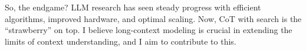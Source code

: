 So, the endgame?
%
LLM research has seen steady progress with efficient algorithms, improved hardware, and optimal scaling.
%
Now, CoT with search is the ``strawberry'' on top.
%
I believe long-context modeling is crucial in extending the limits of context understanding, and I aim to contribute to this.
